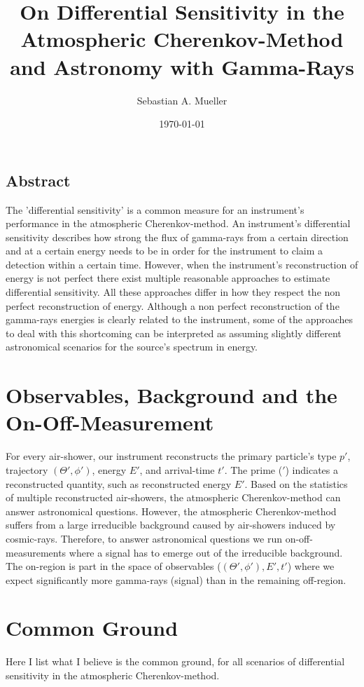 \documentclass{article}%
\title{
    On Differential Sensitivity in the Atmospheric Cherenkov-Method and Astronomy with Gamma-Rays
}%
\author{Sebastian A. Mueller}%
\date{\today{}}%
\begin{document}
%
    \maketitle%
    \newcommand{\dd}[2]{\frac{\mathrm{d}#1}{\mathrm{d}#2}}
    \subsection*{Abstract}
        The 'differential sensitivity' is a common measure for an instrument's performance in the atmospheric Cherenkov-method.
        An instrument's differential sensitivity describes how strong the flux of gamma-rays from a certain direction and at a certain energy needs to be in order for the instrument to claim a detection within a certain time.
        However, when the instrument's reconstruction of energy is not perfect there exist multiple reasonable approaches to estimate differential sensitivity.
        All these approaches differ in how they respect the non perfect reconstruction of energy.
        Although a non perfect reconstruction of the gamma-rays energies is clearly related to the instrument, some of the approaches to deal with this shortcoming can be interpreted as assuming slightly different astronomical scenarios for the source's spectrum in energy.
    \section{Observables, Background and the On-Off-Measurement}
        \label{SecObservablesAndOnOff}
        For every air-shower, our instrument reconstructs the primary particle's type $p'$, trajectory $(\Theta', \phi')$, energy $E'$, and arrival-time $t'$.
        The prime ($'$) indicates a reconstructed quantity, such as reconstructed energy $E'$.
        Based on the statistics of multiple reconstructed air-showers, the atmospheric Cherenkov-method can answer astronomical questions.
        However, the atmospheric Cherenkov-method suffers from a large irreducible background caused by air-showers induced by cosmic-rays.
        Therefore, to answer astronomical questions we run on-off-measurements where a signal has to emerge out of the irreducible background.
        The on-region is part in the space of observables ($(\Theta', \phi'), E', t'$) where we expect significantly more gamma-rays (signal) than in the remaining off-region.
    \section{Common Ground}
        \label{SecCommonGround}
        Here I list what I believe is the common ground, for all scenarios of differential sensitivity in the atmospheric Cherenkov-method.
\end{document}
